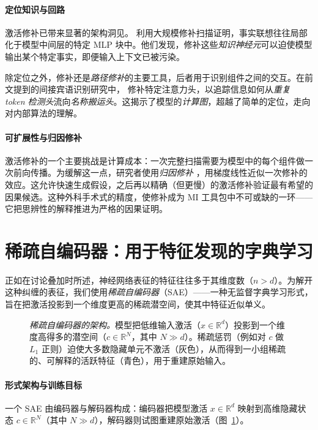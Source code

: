 \paragraph{定位知识与回路}
激活修补已带来显著的架构洞见。\citet{meng2022locating} 利用大规模修补扫描证明，事实联想往往局部化于模型中间层的特定 MLP 块中。他们发现，修补这些\emph{知识神经元}可以迫使模型输出某个特定事实，即便输入上下文已被污染。

除定位之外，修补还是\emph{路径修补}的主要工具，后者用于识别组件之间的交互。在前文提到的间接宾语识别研究中，\citet{wang2022interpretability} 修补特定注意力头，以追踪信息如何从{\em 重复 token 检测头}流向{\em 名称搬运头}。这揭示了模型的\emph{计算图}，超越了简单的定位，走向对内部算法的理解。

\paragraph{可扩展性与归因修补}
激活修补的一个主要挑战是计算成本：一次完整扫描需要为模型中的每个组件做一次前向传播。为缓解这一点，研究者使用\emph{归因修补} \citep{syed2024attribution}，用梯度线性近似一次修补的效应。这允许快速生成假设，之后再以精确（但更慢）的激活修补验证最有希望的因果候选。这种外科手术式的精度，使修补成为 MI 工具包中不可或缺的一环——它把思辨性的解释推进为严格的因果证明。


\section{稀疏自编码器：用于特征发现的字典学习}

正如在讨论叠加时所述，神经网络表征的特征往往多于其维度数（$n > d$）。为解开这种纠缠的表征，我们使用\emph{稀疏自编码器}（SAE）——一种无监督字典学习形式，旨在把激活投影到一个维度更高的稀疏潜空间，使其中特征近似单义。

\begin{figure}[htbp]
    \centering
    \resizebox{0.85\textwidth}{!}{
        
    }
    \caption{\emph{稀疏自编码器的架构。}模型把低维输入激活（$x \in \mathbb{R}^d$）投影到一个维度高得多的潜空间（$c \in \mathbb{R}^N$，其中 $N \gg d$）。稀疏惩罚（例如对 $c$ 做 $L_1$ 正则）迫使大多数隐藏单元不激活（灰色），从而得到一小组稀疏的、可解释的活跃特征（青色），用于重建原始输入。\label{fig:sae_architecture}}
    
\end{figure}

\paragraph{形式架构与训练目标}
一个 SAE 由编码器与解码器构成：编码器把模型激活 $x \in \mathbb{R}^d$ 映射到高维隐藏状态 $c \in \mathbb{R}^N$（其中 $N \gg d$），解码器则试图重建原始激活（图~\ref{fig:sae_architecture}）。

